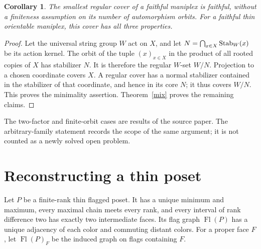 \documentclass[a4paper,11pt]{article}
\newtheorem{corollary}[theorem]{Corollary}\newtheorem{proposition}[theorem]{Proposition}
\newcommand{\Fl}{\operatorname{Fl}}\newcommand{\gen}[1]{\langle#1\rangle}
\begin{document}
\begin{corollary}\label{regularcover}
The smallest regular cover of a faithful maniplex is faithful, without
a finiteness assumption on its number of automorphism orbits. For
a faithful thin orientable maniplex, this cover has all three properties.
\end{corollary}
\begin{proof}
Let the universal string group $W$ act on $X$, and let
$N=\bigcap_{x\in X}\operatorname{Stab}_W(x)$ be its action kernel. The orbit of the
tuple $(x)_{x\in X}$ in the product of all rooted copies of $X$ has
stabilizer $N$. It is therefore the regular $W$-set $W/N$.
Projection to a chosen coordinate covers $X$. A regular cover has
a normal stabilizer contained in the stabilizer of that coordinate,
and hence in its core $N$; it thus covers $W/N$. This proves the
minimality assertion. Theorem~\ref{mix} proves the remaining claims.
\end{proof}
The two-factor and finite-orbit cases are results of the source paper.
The arbitrary-family statement records the scope of the same argument;
it is not counted as a newly solved open problem.

\section{Reconstructing a thin poset}
Let $P$ be a finite-rank thin flagged poset. It has a unique minimum
and maximum, every maximal chain meets every rank, and every interval
of rank difference two has exactly two intermediate faces. Its flag
graph $\Fl(P)$ has a unique adjacency of each color and commuting
distant colors. For a proper face $F$, let $\Fl(P)_F$ be the induced
graph on flags containing $F$.
\end{document}
